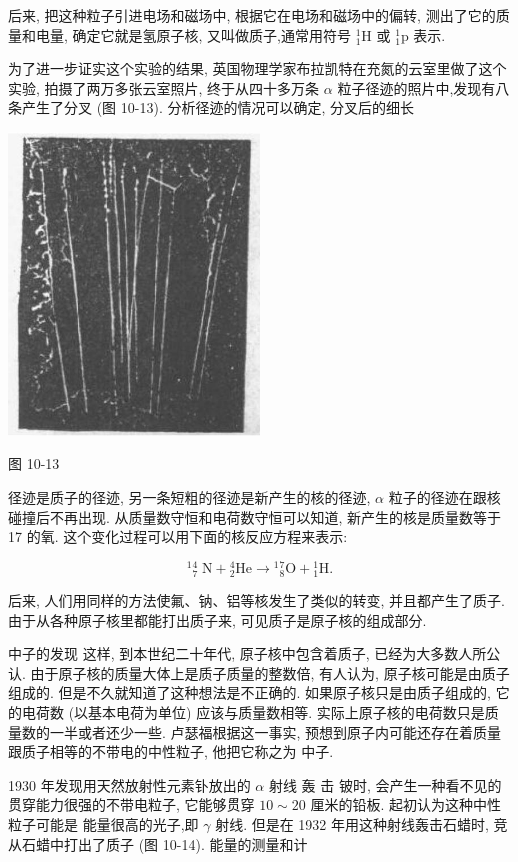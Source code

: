 \documentclass[10pt]{article}
\begin{document}
后来, 把这种粒子引进电场和磁场中, 根据它在电场和磁场中的偏转, 测出了它的质量和电量, 确定它就是氢原子核, 又叫做质子,通常用符号 \({}_{1}^{1}\mathrm{H}\) 或 \({}_{1}^{1}\mathrm{p}\) 表示.

为了进一步证实这个实验的结果, 英国物理学家布拉凯特在充氮的云室里做了这个实验, 拍摄了两万多张云室照片, 终于从四十多万条 \(\alpha\) 粒子径迹的照片中,发现有八条产生了分叉 (图 10-13). 分析径迹的情况可以确定, 分叉后的细长

\begin{center}
\includegraphics[max width=0.5\textwidth]{images/01913056-1f15-74d8-9184-9aab52c9d66b_349_743584.jpg}
\end{center}

图 10-13

径迹是质子的径迹, 另一条短粗的径迹是新产生的核的径迹, \(\alpha\) 粒子的径迹在跟核碰撞后不再出现. 从质量数守恒和电荷数守恒可以知道, 新产生的核是质量数等于 17 的氧. 这个变化过程可以用下面的核反应方程来表示:

\[
{}^{1}{}_{7}^{4}\mathrm{\;N} + {}_{2}^{4}\mathrm{{He}} \rightarrow {}^{1}{}_{8}^{7}\mathrm{O} + {}_{1}^{1}\mathrm{H}.
\]

后来, 人们用同样的方法使氟、钠、铝等核发生了类似的转变, 并且都产生了质子. 由于从各种原子核里都能打出质子来, 可见质子是原子核的组成部分.

中子的发现 这样, 到本世纪二十年代, 原子核中包含着质子, 已经为大多数人所公认. 由于原子核的质量大体上是质子质量的整数倍, 有人认为, 原子核可能是由质子组成的. 但是不久就知道了这种想法是不正确的. 如果原子核只是由质子组成的, 它的电荷数 (以基本电荷为单位) 应该与质量数相等. 实际上原子核的电荷数只是质量数的一半或者还少一些. 卢瑟福根据这一事实, 预想到原子内可能还存在着质量跟质子相等的不带电的中性粒子, 他把它称之为 中子.

1930 年发现用天然放射性元素钋放出的 \(\alpha\) 射线 轰 击 铍时, 会产生一种看不见的贯穿能力很强的不带电粒子, 它能够贯穿 \({10} \sim {20}\) 厘米的铅板. 起初认为这种中性粒子可能是 能量很高的光子,即 \(\gamma\) 射线. 但是在 1932 年用这种射线轰击石蜡时, 竞从石蜡中打出了质子 (图 10-14). 能量的测量和计
\end{document}
